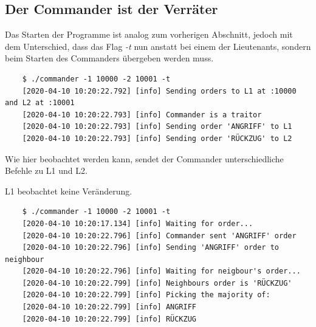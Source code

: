 \documentclass{article}
\begin{document}
\subsection{Der Commander ist der Verräter}

Das Starten der Programme ist analog zum vorherigen Abschnitt, jedoch mit dem Unterschied, dass das 
Flag \textit{-t} nun anstatt bei einem der Lieutenants, sondern beim Starten des Commanders 
übergeben werden muss.

\begin{center}
    \begin{verbatim}
    $ ./commander -1 10000 -2 10001 -t
    [2020-04-10 10:20:22.792] [info] Sending orders to L1 at :10000 and L2 at :10001
    [2020-04-10 10:20:22.793] [info] Commander is a traitor
    [2020-04-10 10:20:22.793] [info] Sending order 'ANGRIFF' to L1
    [2020-04-10 10:20:22.793] [info] Sending order 'RÜCKZUG' to L2
    \end{verbatim}
\end{center}

Wie hier beobachtet werden kann, sendet der Commander unterschiedliche Befehle zu L1 und L2. 

\medskip 

L1 beobachtet keine Veränderung. 

\begin{center}
    \begin{verbatim}
    $ ./commander -1 10000 -2 10001 -t
    [2020-04-10 10:20:17.134] [info] Waiting for order...
    [2020-04-10 10:20:22.796] [info] Commander sent 'ANGRIFF' order
    [2020-04-10 10:20:22.796] [info] Sending 'ANGRIFF' order to neighbour
    [2020-04-10 10:20:22.796] [info] Waiting for neigbour's order...
    [2020-04-10 10:20:22.799] [info] Neighbours order is 'RÜCKZUG'
    [2020-04-10 10:20:22.799] [info] Picking the majority of:
    [2020-04-10 10:20:22.799] [info] ANGRIFF
    [2020-04-10 10:20:22.799] [info] RÜCKZUG
    \end{verbatim}
\end{center}

\newpage

\printbibliography
\end{document}
